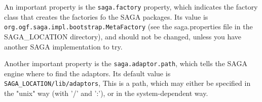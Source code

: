 \documentclass[a4paper,10pt]{article}
\begin{document}
An important property is the \texttt{saga.factory} property, which
indicates the factory class that creates the factories fo the SAGA
packages. Its value is \texttt{org.ogf.saga.impl.bootstrap.MetaFactory}
(see the saga.properties file in the SAGA\_LOCATION directory), and
should not be changed, unless you have another SAGA implementation to try.

Another important property is the \texttt{saga.adaptor.path},
which tells the SAGA engine where to find the adaptors.
Its default value is \texttt{SAGA\_LOCATION/lib/adaptors}, 
This is a path, which may either be specified in the "unix" way
(with '/' and ':'), or in the system-dependent way.
\end{document}
